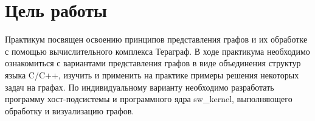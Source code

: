 \chapter*{Цель работы}

Практикум посвящен освоению принципов представления графов и их обработке с помощью вычислительного комплекса Тераграф. В ходе практикума необходимо ознакомиться с вариантами представления графов в виде объединения структур языка C/C++, изучить и применить на практике примеры решения некоторых задач на графах. По индивидуальному варианту необходимо разработать программу хост-подсистемы и программного ядра sw\_kernel, выполняющего обработку и визуализацию графов.

